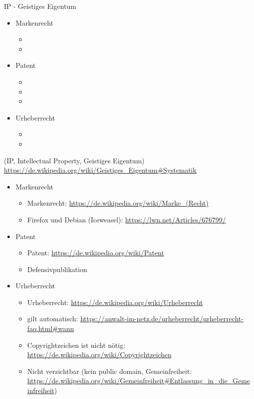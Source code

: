 \begin{frame}{IP - Geistiges Eigentum}
	\begin{itemize}
		\item Markenrecht
		\begin{itemize}
			\item {}
			\item {}
		\end{itemize}
		\item Patent
		\begin{itemize}
			\item {}
			\item {}
			\item {}
		\end{itemize}
		\item Urheberrecht
		\begin{itemize}
			\item {}
			\item \todo{\textcopyright}
		\end{itemize}
	\end{itemize}
\end{frame}
\note
{
	(IP, Intellectual Property, Geistiges Eigentum) \url{https://de.wikipedia.org/wiki/Geistiges\_Eigentum\#Systematik}
	\begin{itemize}
		\item Markenrecht
		\begin{itemize}
			\item Markenrecht: \url{https://de.wikipedia.org/wiki/Marke_(Recht)}
			\item Firefox und Debian (Iceweasel): \url{https://lwn.net/Articles/676799/}
		\end{itemize}
		\item Patent
		\begin{itemize}
			\item Patent: \url{https://de.wikipedia.org/wiki/Patent}
			\item Defensivpublikation
		\end{itemize}
		\item Urheberrecht
		\begin{itemize}
			\item Urheberrecht: \url{https://de.wikipedia.org/wiki/Urheberrecht}
			\item gilt automatisch: \url{https://anwalt-im-netz.de/urheberrecht/urheberrecht-faq.html\#wann}
			\item Copyrightzeichen ist nicht nötig: \url{https://de.wikipedia.org/wiki/Copyrightzeichen}
			\item Nicht verzichtbar (kein public domain, Gemeinfreiheit: \url{https://de.wikipedia.org/wiki/Gemeinfreiheit\#Entlassung\_in\_die\_Gemeinfreiheit})
		\end{itemize}
	\end{itemize}
}
